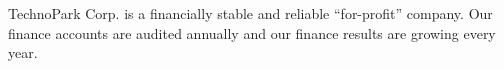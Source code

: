 TechnoPark Corp. is a financially stable and reliable ``for-profit'' company. Our
finance accounts are audited annually and our finance results are growing
every year.
